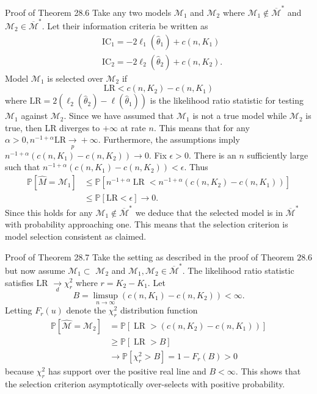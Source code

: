 \documentclass[10pt]{article}
\begin{document}
Proof of Theorem 28.6 Take any two models $\mathscr{M}_{1}$ and $\mathscr{M}_{2}$ where $\mathcal{M}_{1} \notin \overline{\mathscr{M}}^{*}$ and $\mathscr{M}_{2} \in \overline{\mathscr{M}}^{*}$. Let their information criteria be written as
$$
\begin{aligned}
&\mathrm{IC}_{1}=-2 \ell_{1}\left(\widehat{\theta}_{1}\right)+c\left(n, K_{1}\right) \\
&\mathrm{IC}_{2}=-2 \ell_{2}\left(\widehat{\theta}_{2}\right)+c\left(n, K_{2}\right) .
\end{aligned}
$$
Model $\mathscr{M}_{1}$ is selected over $\mathscr{M}_{2}$ if
$$
\mathrm{LR}<c\left(n, K_{2}\right)-c\left(n, K_{1}\right)
$$
where $\mathrm{LR}=2\left(\ell_{2}\left(\widehat{\theta}_{2}\right)-\ell\left(\widehat{\theta}_{1}\right)\right)$ is the likelihood ratio statistic for testing $\mathcal{M}_{1}$ against $\mathcal{M}_{2}$. Since we have assumed that $\mathscr{M}_{1}$ is not a true model while $\mathscr{M}_{2}$ is true, then LR diverges to $+\infty$ at rate $n$. This means that for any $\alpha>0, n^{-1+\alpha} \mathrm{LR} \underset{p}{\rightarrow}+\infty$. Furthermore, the assumptions imply $n^{-1+\alpha}\left(c\left(n, K_{1}\right)-c\left(n, K_{2}\right)\right) \longrightarrow 0$. Fix $\epsilon>0$. There is an $n$ sufficiently large such that $n^{-1+\alpha}\left(c\left(n, K_{1}\right)-c\left(n, K_{2}\right)\right)<\epsilon$. Thus
$$
\begin{aligned}
\mathbb{P}\left[\widehat{M}=\mathscr{M}_{1}\right] & \leq \mathbb{P}\left[n^{-1+\alpha} \operatorname{LR}<n^{-1+\alpha}\left(c\left(n, K_{2}\right)-c\left(n, K_{1}\right)\right)\right] \\
& \leq \mathbb{P}[\mathrm{LR}<\epsilon] \rightarrow 0 .
\end{aligned}
$$
Since this holds for any $\mathscr{M}_{1} \notin \overline{\mathscr{M}}^{*}$ we deduce that the selected model is in $\overline{\mathscr{M}}^{*}$ with probability approaching one. This means that the selection criterion is model selection consistent as claimed.

Proof of Theorem 28.7 Take the setting as described in the proof of Theorem $28.6$ but now assume $\mathscr{M}_{1} \subset$ $\mathcal{M}_{2}$ and $\mathscr{M}_{1}, \mathscr{M}_{2} \in \overline{\mathcal{M}}^{*}$. The likelihood ratio statistic satisfies LR $\underset{d}{\longrightarrow} \chi_{r}^{2}$ where $r=K_{2}-K_{1}$. Let
$$
B=\limsup _{n \rightarrow \infty}\left(c\left(n, K_{1}\right)-c\left(n, K_{2}\right)\right)<\infty .
$$
Letting $F_{r}(u)$ denote the $\chi_{r}^{2}$ distribution function
$$
\begin{aligned}
\mathbb{P}\left[\widehat{\mathscr{M}}=\mathscr{M}_{2}\right] &=\mathbb{P}\left[\operatorname{LR}>\left(c\left(n, K_{2}\right)-c\left(n, K_{1}\right)\right)\right] \\
& \geq \mathbb{P}[\operatorname{LR}>B] \\
& \rightarrow \mathbb{P}\left[\chi_{r}^{2}>B\right]=1-F_{r}(B)>0
\end{aligned}
$$
because $\chi_{r}^{2}$ has support over the positive real line and $B<\infty$. This shows that the selection criterion asymptotically over-selects with positive probability.
\end{document}

